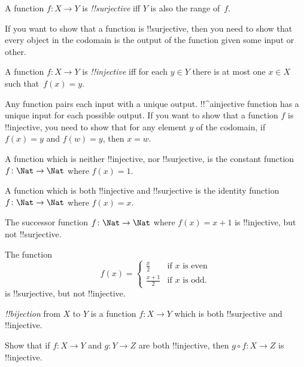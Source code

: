 \documentclass[../../include/open-logic-section]{subfiles}
\begin{document}

\begin{defn}
A function $f \colon X \rightarrow Y$ is \emph{!!{surjective}} iff $Y$ is also
the range of~$f$.
\end{defn}

\begin{explain}
If you want to show that a function is !!{surjective}, then you need
to show that every object in the codomain is the output of the
function given some input or other.
\end{explain}

\begin{defn}
A function $f \colon X \rightarrow Y$ is \emph{!!{injective}} iff for
each $y \in Y$ there is at most one $x \in X$ such that~$f(x) = y$.
\end{defn}

\begin{explain}
Any function pairs each input with a unique output. !!^a{injective}
function has a unique input for each possible output. If you want to
show that a function $f$ is !!{injective}, you need to show that for
any element $y$ of the codomain, if $f(x)=y$ and $f(w)=y$, then $x=w$.

A function which is neither !!{injective}, nor !!{surjective}, is the
constant function $f\colon \Nat \rightarrow \Nat$ where $f(x) = 1$.
    
A function which is both !!{injective} and !!{surjective} is the
identity function $f\colon \Nat \rightarrow \Nat$ where $f(x) = x$.

The successor function $f \colon \Nat \rightarrow \Nat$ where $f(x) =
x+1$ is !!{injective}, but not !!{surjective}.

The function 
\[
f(x) = 
\begin{cases}
  \frac{x}{2} & \text{if $x$ is even} \\
  \frac{x+1}{2} & \text{if $x$ is odd.}
\end{cases}
\]
is !!{surjective}, but not !!{injective}.

\end{explain}

\begin{defn}
 \emph{!!{bijection}} from $X$ to $Y$ is a
function $f \colon X \rightarrow Y$ which is both !!{surjective} and
!!{injective}.
\end{defn}

\begin{prob}
Show that if $f \colon X \to Y$ and $g \colon Y \to Z$ are both
!!{injective}, then $g \circ f \colon X \to Z$ is !!{injective}.
\end{prob}
\end{document}
